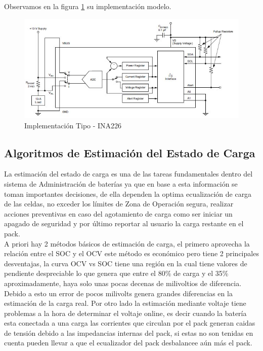 \documentclass[10pt,a4paper]{article}
\begin{document}
	\clearpage
	
	Observamos en la figura \ref{fig:ina226-commonimplementation} su implementación modelo. 
	
	\begin{figure}[h!]
		\begin{center}
			\includegraphics[width=0.6\linewidth]{assets/INA226-Common_Implementation}
			\caption{Implementación Tipo - INA226}
			\label{fig:ina226-commonimplementation}
		\end{center}	
	\end{figure}
	
	
	
	
	\subsection{Algoritmos de Estimación del Estado de Carga}
	La estimación del estado de carga es una de las tareas fundamentales dentro del sistema de Administración de baterías ya que en base a esta información se toman importantes decisiones, de ella dependen la optima ecualización de carga de las celdas, no exceder los límites de Zona de Operación segura, realizar acciones preventivas en caso del agotamiento de carga como ser iniciar un apagado de seguridad y por último reportar al usuario la carga restante en el pack.\\
	
	A priori hay 2 métodos básicos de estimación de carga, el primero aprovecha la relación entre el SOC y el OCV este método es económico pero tiene 2 principales desventajas, la curva OCV vs SOC tiene una región en la cual tiene valores de pendiente despreciable lo que genera que entre el 80\% de carga y el 35\% aproximadamente, haya solo unas pocas decenas de milivoltios de diferencia. Debido a esto un error de pocos milivolts genera grandes diferencias en la estimación de la carga real. Por otro lado la estimación mediante voltaje tiene problemas a la hora de determinar el voltaje online, es decir cuando la batería esta conectada a una carga las corrientes que circulan por el pack generan caidas de tensión debido a las impedancias internas del pack, si estas no son tenidas en cuenta pueden llevar a que el ecualizador del pack desbalancee aún más el pack.\\
	
\end{document}
